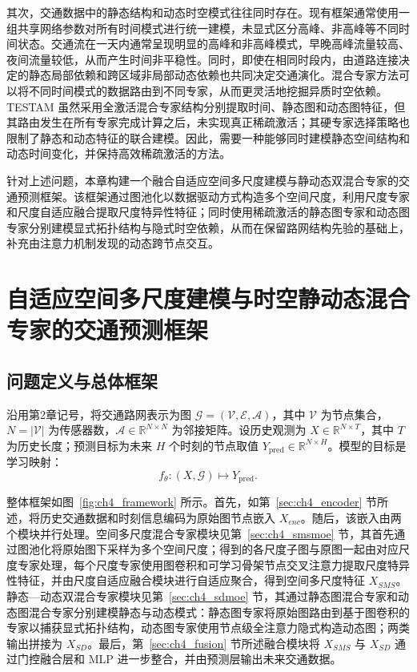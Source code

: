 其次，交通数据中的静态结构和动态时空模式往往同时存在。现有框架通常使用一组共享网络参数对所有时间模式进行统一建模，未显式区分高峰、非高峰等不同时间状态。交通流在一天内通常呈现明显的高峰和非高峰模式，早晚高峰流量较高、夜间流量较低，从而产生时间非平稳性。同时，即使在相同时段内，由道路连接决定的静态局部依赖和跨区域非局部动态依赖也共同决定交通演化。混合专家方法可以将不同时间模式的数据路由到不同专家，从而更灵活地挖掘异质时空依赖。TESTAM 虽然采用全激活混合专家结构分别提取时间、静态图和动态图特征，但其路由发生在所有专家完成计算之后，未实现真正稀疏激活；其硬专家选择策略也限制了静态和动态特征的联合建模。因此，需要一种能够同时建模静态空间结构和动态时间变化，并保持高效稀疏激活的方法。

针对上述问题，本章构建一个融合自适应空间多尺度建模与静动态双混合专家的交通预测框架。该框架通过图池化以数据驱动方式构造多个空间尺度，利用尺度专家和尺度自适应融合提取尺度特异性特征；同时使用稀疏激活的静态图专家和动态图专家分别建模显式拓扑结构与隐式时空依赖，从而在保留路网结构先验的基础上，补充由注意力机制发现的动态跨节点交互。


\section{自适应空间多尺度建模与时空静动态混合专家的交通预测框架}
\label{sec:ch4_method}

\subsection{问题定义与总体框架}
\label{sec:ch4_overall}

沿用第2章记号，将交通路网表示为图 $\mathcal{G}=(\mathcal{V},\mathcal{E},\mathcal{A})$，其中 $\mathcal{V}$ 为节点集合，$N=|\mathcal{V}|$ 为传感器数，$\mathcal{A}\in\mathbb{R}^{N\times N}$ 为邻接矩阵。设历史观测为 $X\in\mathbb{R}^{N\times T}$，其中 $T$ 为历史长度；预测目标为未来 $H$ 个时刻的节点取值 $Y_\mathrm{pred}\in\mathbb{R}^{N\times H}$。模型的目标是学习映射：
\begin{equation}
f_{\theta}:\left(X,\mathcal{G}\right)\mapsto Y_\mathrm{pred}.
\end{equation}

整体框架如图~\ref{fig:ch4_framework} 所示。首先，如第~\ref{sec:ch4_encoder} 节所述，将历史交通数据和时刻信息编码为原始图节点嵌入 $X_{enc}$。随后，该嵌入由两个模块并行处理。空间多尺度混合专家模块见第~\ref{sec:ch4_smsmoe} 节，其首先通过图池化将原始图下采样为多个空间尺度；得到的各尺度子图与原图一起由对应尺度专家处理，每个尺度专家使用图卷积和可学习骨架节点交叉注意力提取尺度特异性特征，并由尺度自适应融合模块进行自适应聚合，得到空间多尺度特征 $X_{SMS}$。静态—动态双混合专家模块见第~\ref{sec:ch4_sdmoe} 节，其通过静态图混合专家和动态图混合专家分别建模静态与动态模式：静态图专家将原始图路由到基于图卷积的专家以捕获显式拓扑结构，动态图专家使用节点级全注意力隐式构造动态图；两类输出拼接为 $X_{SD}$。最后，第~\ref{sec:ch4_fusion} 节所述融合模块将 $X_{SMS}$ 与 $X_{SD}$ 通过门控融合层和 MLP 进一步整合，并由预测层输出未来交通数据。

